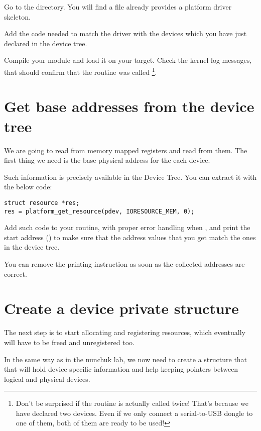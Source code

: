 Go to the  directory.
You will find a  file already provides a platform
driver skeleton.

Add the code needed to match the driver with the devices which you have
just declared in the device tree.

Compile your module and load it on your target. Check the kernel log
messages, that should confirm that the  routine was
called \footnote{Don't be surprised if the  routine is
actually called twice! That's because we have declared two devices.
Even if we only connect a serial-to-USB dongle to one of them, both
of them are ready to be used!}.

\section{Get base addresses from the device tree}

We are going to read from memory mapped registers and read from them.
The first thing we need is the base physical address for the each
device.

Such information is precisely available in the Device Tree. You can
extract it with the below code:

\begin{verbatim}
struct resource *res;
res = platform_get_resource(pdev, IORESOURCE_MEM, 0);
\end{verbatim}

Add such code to your  routine, with proper error
handling when , and print the start address
() to make sure that the address values that
you get match the ones in the device tree. 

You can remove the printing instruction as soon as the collected
addresses are correct.

\section{Create a device private structure}

The next step is to start allocating and registering resources,
which eventually will have to be freed and unregistered too.

In the same way as in the nunchuk lab, we now need to create a
structure that that will hold device specific information and help
keeping pointers between logical and physical devices.


